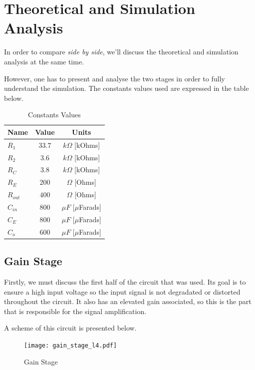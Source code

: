 \section{Theoretical and Simulation Analysis}
\label{sec:analysis}

In order to compare \textit{side by side}, we'll discuss the theoretical and simulation analysis at the same time.

However, one has to present and analyse the two stages in order to fully understand the simulation. The constants values used are expressed in the table below.

\begin{table}[h]
    \centering
    \begin{tabular}{|l|c|c|}
    \hline
    {\bf Name} & {\bf Value} & {\bf Units} \\ \hline
    $R_1$ & $33.7$ & $k\Omega$ [kOhms] \\ \hline
    $R_2$ & $3.6$ & $k\Omega$ [kOhms] \\ \hline
    $R_C$ & $3.8$ & $k\Omega$ [kOhms] \\ \hline
    $R_E$ & $200$ & $\Omega$ [Ohms] \\ \hline
    $R_{out}$ & $400$ & $\Omega$ [Ohms] \\ \hline
    $C_{in}$ & $800$ & $\mu F$ [$\mu$Farads]\\ \hline
    $C_E$ & $800$ & $\mu F$ [$\mu$Farads] \\ \hline
    $C_o$ & $600$ & $\mu F$ [$\mu$Farads] \\ \hline
    \end{tabular}
    \caption{Constants Values}
    \label{tab:constants}
\end{table}

\subsection{Gain Stage}
\label{subsec:stat}

Firstly, we must discuss the first half of the circuit that was used. Its goal is to ensure a high input voltage so the input signal is not degradated or distorted throughout the circuit. It also has an elevated gain associated, so this is the part that is responsible for the signal amplification.

A scheme of this circuit is presented below.

\begin{figure}[h]
    \centering
    \texttt{[image: gain\_stage\_l4.pdf]}
    \caption{Gain Stage}
    \label{fig:gain_stage}
\end{figure}

